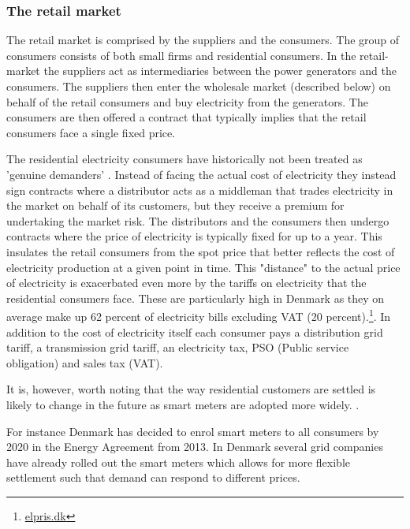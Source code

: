 \subsubsection{The retail market}
\label{subsubsec: t_resmarket}
The retail market is comprised by the suppliers and the consumers. The group of consumers consists of both small firms and residential consumers. In the retail-market the suppliers act as intermediaries between the power generators and the consumers. The suppliers then enter the wholesale market (described below) on behalf of the retail consumers and buy electricity from the generators. The consumers are then offered a contract that typically implies that the retail consumers face a single fixed price. %
\par
The residential electricity consumers have historically not been treated as 'genuine demanders' \citep{kirschen2003demand}. Instead of facing the actual cost of electricity they instead sign contracts where a distributor acts as a middleman that trades electricity in the market on behalf of its customers, but they receive a premium for undertaking the market risk. The distributors and the consumers then undergo contracts where the price of electricity is typically fixed for up to a year. This insulates the retail consumers from the spot price that better reflects the cost of electricity production at a given point in time. This "distance" to the actual price of electricity is exacerbated even more by the tariffs on electricity that the residential consumers face. These are particularly high in Denmark as they on average make up 62 percent of electricity bills excluding VAT (20 percent).\footnote{\href{https://elpris.dk}{elpris.dk}}. In addition to the cost of electricity itself each consumer pays a distribution grid tariff, a transmission grid tariff, an electricity tax, PSO (Public service obligation) and sales tax (VAT).
\par
It is, however, worth noting that the way residential customers are settled is likely to change in the future as smart meters are adopted more widely. .
\par
For instance Denmark has decided to enrol smart meters to all consumers by 2020 in the Energy Agreement from 2013. In Denmark several grid companies have already rolled out the smart meters which allows for more flexible settlement such that demand can respond to different prices. %

